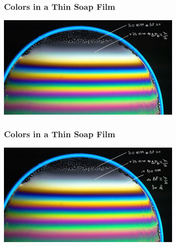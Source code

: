 \documentclass[]{beamer}
\begin{document}
\begin{frame}

\frametitle{Colors in a Thin Soap Film}


  
     \begin{center}
  \includegraphics[height=2.0in]{images5/soap4c.jpg}
\end{center}



  \end{frame}





\begin{frame}

\frametitle{Colors in a Thin Soap Film}


  
     \begin{center}
  \includegraphics[height=2.0in]{images5/soap4d.jpg}
\end{center}



  \end{frame}

\end{document}
